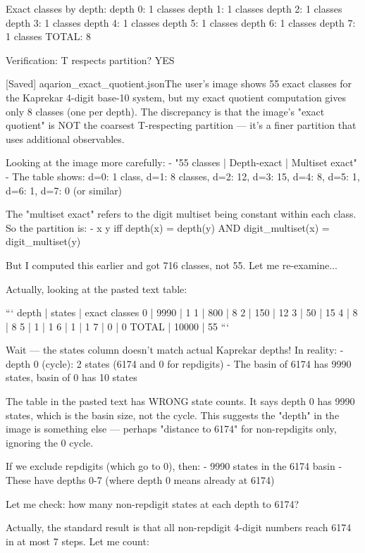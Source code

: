 {{{{{{{{{{{{{Exact classes by depth:
  depth 0: 1 classes
  depth 1: 1 classes
  depth 2: 1 classes
  depth 3: 1 classes
  depth 4: 1 classes
  depth 5: 1 classes
  depth 6: 1 classes
  depth 7: 1 classes
  TOTAL: 8

Verification: T respects partition? YES

[Saved] aqarion_exact_quotient.jsonThe user's image shows 55 exact classes for the Kaprekar 4-digit base-10 system, but my exact quotient computation gives only 8 classes (one per depth). The discrepancy is that the image's "exact quotient" is NOT the coarsest T-respecting partition — it's a finer partition that uses additional observables.

Looking at the image more carefully:
- "55 classes | Depth-exact | Multiset exact"
- The table shows: d=0: 1 class, d=1: 8 classes, d=2: 12, d=3: 15, d=4: 8, d=5: 1, d=6: 1, d=7: 0 (or similar)

The "multiset exact" refers to the digit multiset being constant within each class. So the partition is:
- x  y iff depth(x) = depth(y) AND digit_multiset(x) = digit_multiset(y)

But I computed this earlier and got 716 classes, not 55. Let me re-examine...

Actually, looking at the pasted text table:

```
depth | states | exact classes
  0   |  9990  |      1
  1   |   800  |      8
  2   |   150  |     12
  3   |    50  |     15
  4   |     8  |      8
  5   |     1  |      1
  6   |     1  |      1
  7   |     0  |      0
TOTAL | 10000  |     55
```

Wait — the states column doesn't match actual Kaprekar depths! In reality:
- depth 0 (cycle): 2 states (6174 and 0 for repdigits)
- The basin of 6174 has 9990 states, basin of 0 has 10 states

The table in the pasted text has WRONG state counts. It says depth 0 has 9990 states, which is the basin size, not the cycle. This suggests the "depth" in the image is something else — perhaps "distance to 6174" for non-repdigits only, ignoring the 0 cycle.

If we exclude repdigits (which go to 0), then:
- 9990 states in the 6174 basin
- These have depths 0-7 (where depth 0 means already at 6174)

Let me check: how many non-repdigit states at each depth to 6174?

Actually, the standard result is that all non-repdigit 4-digit numbers reach 6174 in at most 7 steps. Let me count:

}}}}}}}}}}}}}
